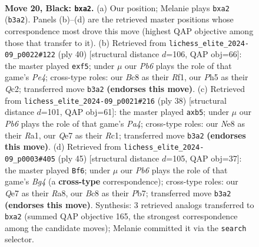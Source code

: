 \documentclass[11pt]{article}
\begin{document}
\clearpage

\begin{figure}[p]\centering
\begin{subfigure}{0.46\textwidth}\centering
\resizebox{\linewidth}{!}{%
\newchessgame
\chessboard[
  setfen={1rbrn1k1/p1p1qp2/6p1/Q1PpP2p/3N4/1p2P1P1/PP1B1P1P/2K1RBR1 b - - 0 20},
  showmover=false,
  pgfstyle=straightmove, color=movearrow, markmove={b3-a2}
]}
\caption{}
\end{subfigure}\hfill
\begin{subfigure}{0.46\textwidth}\centering
\resizebox{\linewidth}{!}{%
\newchessgame
\chessboard[
  setfen={r1b2rk1/bp2q1pp/p1p3n1/P4p2/4PP2/2N4P/1PQBB1P1/R4R1K w - - 1 21},
  showmover=false,
  pgfstyle=straightmove, color=movearrow, markmove={e4-f5}
]}
\caption{}
\end{subfigure}
\\[4pt]
\begin{subfigure}{0.46\textwidth}\centering
\resizebox{\linewidth}{!}{%
\newchessgame
\chessboard[
  setfen={1rb2rk1/5pbp/p2p2p1/1pqP2B1/P1p1PPn1/8/1P1QB1PP/R1RN3K w - - 0 20},
  showmover=false,
  pgfstyle=straightmove, color=movearrow, markmove={a4-b5}
]}
\caption{}
\end{subfigure}\hfill
\begin{subfigure}{0.46\textwidth}\centering
\resizebox{\linewidth}{!}{%
\newchessgame
\chessboard[
  setfen={r1r3k1/1p3ppp/1q1p4/pn1Pp1b1/4PP2/1P1P2P1/1B5P/R2BQR1K b - - 0 23},
  showmover=false,
  pgfstyle=straightmove, color=movearrow, markmove={g5-f6}
]}
\caption{}
\end{subfigure}
\caption{\textbf{Move 20, Black: \texttt{bxa2}.} (a) Our position; Melanie plays \texttt{bxa2} (\texttt{b3a2}). Panels (b)--(d) are the retrieved master positions whose correspondence most drove this move (highest QAP objective among those that transfer to it). (b) Retrieved from \texttt{lichess\_elite\_2024-09\_p0022\#122} (ply 40) [structural distance $d$=106, QAP obj=66]: the master played \texttt{exf5}; under $\mu$ our \emph{Pb6} plays the role of that game's \emph{Pe4}; cross-type roles: our \emph{B}c8 as their \emph{R}f1, our \emph{P}h5 as their \emph{Q}c2; transferred move \texttt{b3a2} \textbf{(endorses this move)}. (c) Retrieved from \texttt{lichess\_elite\_2024-09\_p0021\#216} (ply 38) [structural distance $d$=101, QAP obj=61]: the master played \texttt{axb5}; under $\mu$ our \emph{Pb6} plays the role of that game's \emph{Pa4}; cross-type roles: our \emph{N}e8 as their \emph{R}a1, our \emph{Q}e7 as their \emph{R}c1; transferred move \texttt{b3a2} \textbf{(endorses this move)}. (d) Retrieved from \texttt{lichess\_elite\_2024-09\_p0003\#405} (ply 45) [structural distance $d$=105, QAP obj=37]: the master played \texttt{Bf6}; under $\mu$ our \emph{Pb6} plays the role of that game's \emph{Bg4} (a \textbf{cross-type} correspondence); cross-type roles: our \emph{Q}e7 as their \emph{R}a8, our \emph{B}c8 as their \emph{P}b7; transferred move \texttt{b3a2} \textbf{(endorses this move)}. Synthesis: 3 retrieved analogs transferred to \texttt{bxa2} (summed QAP objective 165, the strongest correspondence among the candidate moves); Melanie committed it via the \texttt{search} selector.}
\label{fig:thought-m39}
\end{figure}
\end{document}
